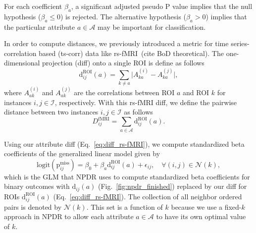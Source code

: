 \documentclass[10pt,letterpaper]{article}\usepackage[]{graphicx}\usepackage[]{color}
\begin{document}
For each coefficient $\beta_a$, a significant adjusted pseudo P value implies that the null hypothesis ($\beta_a \leq 0$) is rejected. The alternative hypothesis ($\beta_a > 0$) implies that the particular attribute $a \in \mathcal{A}$ may be important for classification.

In order to compute distances, we previously introduced a metric for time series-correlation based (ts-corr) data like rs-fMRI~(cite BoD theoretical). The one-dimensional projection (diff) onto a single ROI is define as follows
%
\begin{equation}\label{eq:diff_rs-fMRI}
\text{d}^\text{ROI}_{ij}(a) = \sum_{k \neq a}\bigl|A^{(i)}_{ka} - A^{(j)}_{ka}\bigr|,
\end{equation}
%
where $A^{(i)}_{ak}$ and $A^{(j)}_{ak}$ are the correlations between ROI $a$ and ROI $k$ for instances $i,j \in \mathcal{I}$, respectively. With this rs-fMRI diff, we define the pairwise distance between two instances $i,j \in \mathcal{I}$ as follows
%
\begin{equation}\label{eq:D_rs-fMRI}
D^\text{fMRI}_{ij} = \sum_{a \in \mathcal{A}} \text{d}^\text{ROI}_{ij}(a).
\end{equation}

Using our attribute diff (Eq.~\ref{eq:diff_rs-fMRI}), we compute standardized beta coefficients of the generalized linear model given by
%
\begin{equation}\label{eq:glm_roi}
\text{logit}\left(\text{p}^\text{miss}_{ij}\right) = \beta_0 + \beta_a \text{d}^\text{ROI}_{ij}(a) + \epsilon_{ij}, \quad \forall(i,j) \in \mathcal{N}(k),
\end{equation}
%
which is the GLM that NPDR uses to compute standardized beta coefficients for binary outcomes with $\text{d}_{ij}(a)$ (Fig.~\ref{fig:npdr_finished}) replaced by our diff for ROIs $\text{d}^\text{ROI}_{ij}(a)$ (Eq.~\ref{eq:diff_rs-fMRI}). The collection of all neighbor ordered pairs is denoted by $\mathcal{N}(k)$. This set is a function of $k$ because we use a fixed-$k$ approach in NPDR to allow each attribute $a \in \mathcal{A}$ to have its own optimal value of $k$.
\end{document}

